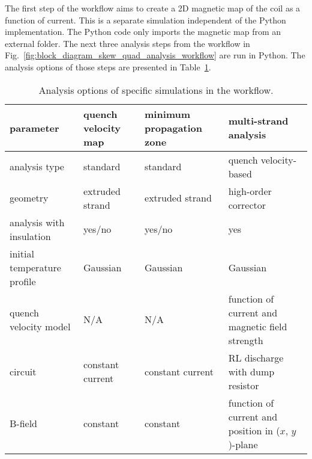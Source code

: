 The first step of the workflow aims to create a 2D magnetic map of the coil as a function of current. This is a separate simulation independent of the Python implementation. The Python code only imports the magnetic map from an external folder. The next three analysis steps from the workflow in Fig.~\ref{fig:block_diagram_skew_quad_analysis_workflow} are run in Python. The analysis options of those steps are presented in Table~\ref{table:workflow_analysis_options}. 

\begin{table}[H]
    \caption{Analysis options of specific simulations in the workflow.} 
    \vspace{-1.em} 
    \fontsize{10}{10}
    \selectfont 
    \renewcommand{\arraystretch}{1.5}
    \begin{center}

        \begin{tabular}{ | m{2.5cm} | m{3.4cm} | m{3.4cm} | m{3.4cm} |}  
        
        \hline
        \centering \textbf{parameter} & 
        \centering \textbf{quench velocity map} & 
        \centering \textbf{minimum propagation zone} &
        \centering \textbf{multi-strand analysis} \tabularnewline
        \hline
        \centering analysis type & 
        \centering standard & 
        \centering standard & 
        \centering quench velocity-based \tabularnewline
        \hline
        \centering geometry & 
        \centering extruded strand & 
        \centering extruded strand & 
        \centering high-order corrector \tabularnewline
        \hline
        \centering analysis with insulation & 
        \centering yes/no & 
        \centering yes/no & 
        \centering yes \tabularnewline
        \hline
        \centering initial temperature profile & 
        \centering Gaussian & 
        \centering Gaussian & 
        \centering Gaussian \tabularnewline
        \hline
        \centering quench velocity model & 
        \centering N/A & 
        \centering N/A & 
        \centering function of current and magnetic field strength \tabularnewline
        \hline
        \centering circuit & 
        \centering constant current & 
        \centering constant current & 
        \centering RL discharge with dump resistor \tabularnewline
        \hline
        \centering B-field & 
        \centering constant & 
        \centering constant & 
        \centering function of current and position in ($x$, $y$)-plane \tabularnewline
        \hline
        \end{tabular}
    \end{center}  
     \label{table:workflow_analysis_options} 
 \end{table}
 
